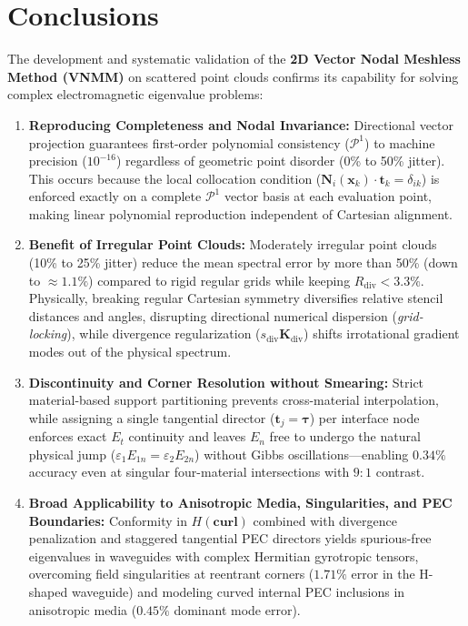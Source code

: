 \documentclass[11pt,a4paper]{article}
\begin{document}
\section{Conclusions}

The development and systematic validation of the \textbf{2D Vector Nodal Meshless Method (VNMM)} on scattered point clouds confirms its capability for solving complex electromagnetic eigenvalue problems:
\begin{enumerate}
  \item \textbf{Reproducing Completeness and Nodal Invariance:} Directional vector projection guarantees first-order polynomial consistency ($\mathcal{P}^1$) to machine precision ($10^{-16}$) regardless of geometric point disorder (0\% to 50\% jitter). This occurs because the local collocation condition ($\mathbf{N}_i(\mathbf{x}_k)\cdot\mathbf{t}_k = \delta_{ik}$) is enforced exactly on a complete $\mathcal{P}^1$ vector basis at each evaluation point, making linear polynomial reproduction independent of Cartesian alignment.
  \item \textbf{Benefit of Irregular Point Clouds:} Moderately irregular point clouds (10\% to 25\% jitter) reduce the mean spectral error by more than 50\% (down to $\approx 1.1\%$) compared to rigid regular grids while keeping $R_{\mathrm{div}} < 3.3\%$. Physically, breaking regular Cartesian symmetry diversifies relative stencil distances and angles, disrupting directional numerical dispersion (\textit{grid-locking}), while divergence regularization ($s_{\mathrm{div}}\mathbf{K}_{\mathrm{div}}$) shifts irrotational gradient modes out of the physical spectrum.
  \item \textbf{Discontinuity and Corner Resolution without Smearing:} Strict material-based support partitioning prevents cross-material interpolation, while assigning a single tangential director ($\mathbf{t}_j = \boldsymbol{\tau}$) per interface node enforces exact $E_t$ continuity and leaves $E_n$ free to undergo the natural physical jump ($\varepsilon_1 E_{1n} = \varepsilon_2 E_{2n}$) without Gibbs oscillations---enabling $0.34\%$ accuracy even at singular four-material intersections with $9:1$ contrast.
  \item \textbf{Broad Applicability to Anisotropic Media, Singularities, and PEC Boundaries:} Conformity in $H(\mathbf{curl})$ combined with divergence penalization and staggered tangential PEC directors yields spurious-free eigenvalues in waveguides with complex Hermitian gyrotropic tensors, overcoming field singularities at reentrant corners ($1.71\%$ error in the H-shaped waveguide) and modeling curved internal PEC inclusions in anisotropic media ($0.45\%$ dominant mode error).
\end{enumerate}
\end{document}
